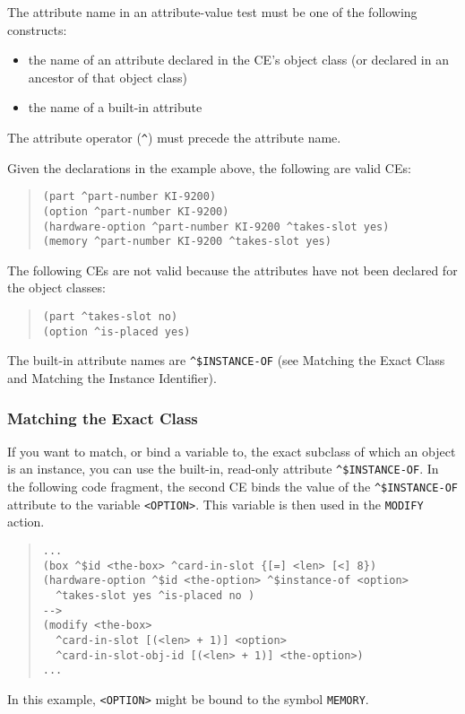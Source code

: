 The attribute name in an attribute-value test must be one
of the following constructs:
\begin{itemize}
\item the name of an attribute declared in the CE's object class (or
  declared in an ancestor of that object class)
\item the name of a built-in attribute
\end{itemize}
The attribute operator (\verb|^|) must precede the attribute name.

Given the declarations in the example above, the following are valid
CEs:

\begin{quote}
\begin{verbatim}
(part ^part-number KI-9200)
(option ^part-number KI-9200)
(hardware-option ^part-number KI-9200 ^takes-slot yes)
(memory ^part-number KI-9200 ^takes-slot yes)
\end{verbatim}
\end{quote}

The following CEs are not valid because the attributes
have not been declared for the object classes:

\begin{quote}
\begin{verbatim}
(part ^takes-slot no)
(option ^is-placed yes)
\end{verbatim}
\end{quote}

The built-in attribute names are \verb|^$INSTANCE-OF| (see
Matching the Exact Class and Matching the Instance
Identifier).

\subsubsection*{Matching the Exact Class}

If you want to match, or bind a variable to, the exact subclass of
which an object is an instance, you can use the built-in, read-only
attribute
\verb|^$INSTANCE-OF|. In the following code fragment, the second CE
binds the value of the \verb|^$INSTANCE-OF| attribute to the variable
\verb|<OPTION>|. This variable is then used in the \verb|MODIFY|
action.

\begin{quote}
\begin{verbatim}
...
(box ^$id <the-box> ^card-in-slot {[=] <len> [<] 8})
(hardware-option ^$id <the-option> ^$instance-of <option>
  ^takes-slot yes ^is-placed no )
-->
(modify <the-box>
  ^card-in-slot [(<len> + 1)] <option>
  ^card-in-slot-obj-id [(<len> + 1)] <the-option>)
...
\end{verbatim}
\end{quote}
In this example, \verb|<OPTION>| might be bound to the symbol
\verb|MEMORY|.

